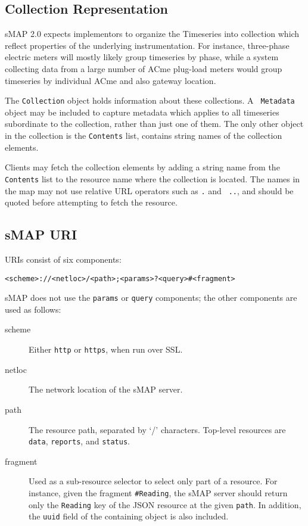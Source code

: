 \documentclass[10pt,letterpaper]{article}
\newcommand{\smap}{sMAP}
\newcommand{\smapversion}{2.0}
\begin{document}
\subsection{Collection Representation}

\smap{} \smapversion{} expects implementors to organize the Timeseries into collection
which reflect properties of the underlying instrumentation.  For instance,
three-phase electric meters will mostly likely group timeseries by phase,
while a system collecting data from a large number of ACme plug-load meters
would group timeseries by individual ACme and also gateway location.



The {\tt Collection} object holds information about these collections.  A {\tt
  Metadata} object may be included to capture metadata which applies to all
timeseries subordinate to the collection, rather than just one of them.  The
only other object in the collection is the {\tt Contents} list, contains
string names of the collection elements.

Clients may fetch the collection elements by adding a string name from the
{\tt Contents} list to the resource name where the collection is located.  The
names in the map may not use relative URL operators such as {\tt .} and {\tt
  ..}, and should be quoted before attempting to fetch the resource.

\subsection{\smap{} URI}
URIs consist of six components: 
\begin{verbatim}
<scheme>://<netloc>/<path>;<params>?<query>#<fragment>
\end{verbatim}
%
\smap{} does not use the {\tt params} or {\tt query} components; the other
components are used as follows:

\begin{description}
\item[scheme] Either {\tt http} or {\tt https}, when run over SSL.
\item[netloc] The network location of the \smap{} server.
\item[path] The resource path, separated by `/' characters.  Top-level
  resources are {\tt data}, {\tt reports}, and {\tt status}.
\item[fragment] Used as a sub-resource selector to select only part of a
  resource.  For instance, given the fragment {\tt \#Reading}, the \smap{}
  server should return only the {\tt Reading} key of the JSON resource at the
  given {\tt path}.  In addition, the {\tt uuid} field of the containing
  object is also included.
\end{description}
\end{document}
